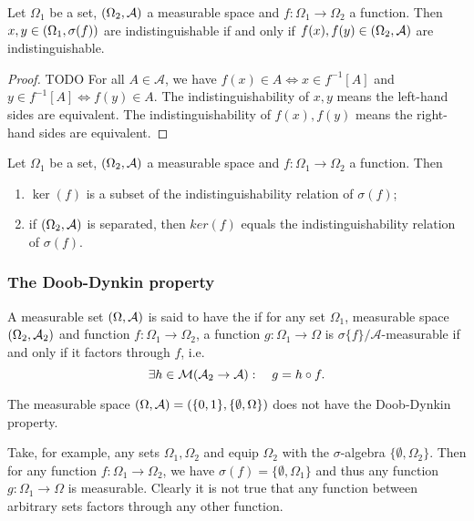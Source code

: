 \begin{lemma}
Let $\Omega_1$ be a set, $\left( \Omega_2, \mathcal{A} \right)$ a measurable space and $f: \Omega_1\to \Omega_2$ a function. Then $x,y\in \left( \Omega_1,\sigma(f) \right)$ are indistinguishable \textup{if and only if} $f(x), f(y) \in \left( \Omega_2,\mathcal{A} \right)$ are indistinguishable.
\end{lemma}
\begin{proof}
TODO For all $A\in\mathcal{A}$, we have $f(x)\in A \iff x\in f^{-1}[A]$ and $y\in f^{-1}[A]\iff f(y)\in A$. The indistinguishability of $x,y$ means the left-hand sides are equivalent. The indistinguishability of $f(x),f(y)$ means the right-hand sides are equivalent.
\end{proof}
\begin{corollary}
Let $\Omega_1$ be a set, $\left( \Omega_2, \mathcal{A} \right)$ a measurable space and $f: \Omega_1\to \Omega_2$ a function. Then
\begin{enumerate}
\item $\ker(f)$ is a subset of the indistinguishability relation of $\sigma(f)$;
\item if $\left( \Omega_2, \mathcal{A} \right)$ is separated, then $ker(f)$ equals the indistinguishability relation of $\sigma(f)$.
\end{enumerate}
\end{corollary}


\subsubsection{The Doob-Dynkin property}
\begin{definition}
A measurable set $\left( \Omega,\mathcal{A} \right)$ is said to have the  if for any set $\Omega_1$, measurable space $\left( \Omega_2,\mathcal{A}_2 \right)$ and function $f: \Omega_1 \to \Omega_2$, a function $g: \Omega_1\to \Omega$ is $\sigma\{f\}/\mathcal{A}$-measurable \textup{if and only if} it factors through $f$, i.e.
\[\exists h\in \operatorname{\mathcal{M}}(\mathcal{A}_2\to \mathcal{A}):\quad g = h\circ f. \]
\end{definition}

\begin{example}
The measurable space $\left( \Omega, \mathcal{A} \right) = \left( \{0,1\}, \{\emptyset,\Omega\} \right)$ does not have the Doob-Dynkin property. 

Take, for example, any sets $\Omega_1, \Omega_2$ and equip $\Omega_2$ with the $\sigma$-algebra $\{\emptyset, \Omega_2\}$. Then for any function $f:\Omega_1 \to \Omega_2$, we have $\sigma(f) = \{\emptyset, \Omega_1\}$ and thus any function $g: \Omega_1 \to \Omega$ is measurable. Clearly it is not true that any function between arbitrary sets factors through any other function.
\end{example}


